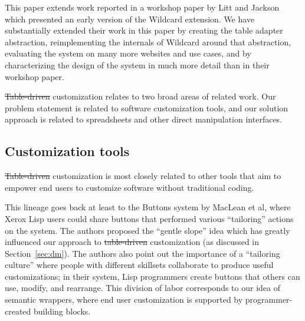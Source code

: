 \documentclass[sigplan,screen,10pt,anonymous,review]{acmart}
\providecommand{\DIFadd}[1]{{\protect\color{blue}\uwave{#1}}} %
\providecommand{\DIFdel}[1]{{\protect\color{red}\sout{#1}}}                      %
\providecommand{\DIFaddbegin}{} %
\providecommand{\DIFaddend}{} %
\providecommand{\DIFdelbegin}{} %
\providecommand{\DIFdelend}{} %
\begin{document}
This paper extends work reported in a workshop paper by Litt and Jackson
\citep{litt2020} which presented an early version of the Wildcard
extension. We have substantially extended their work in this paper by
creating the table adapter abstraction, reimplementing the internals of
Wildcard around that abstraction, evaluating the system on many more
websites and use cases, and by characterizing the design of the system
in much more detail than in their workshop paper.

\DIFdelbegin \DIFdel{Table-driven }\DIFdelend \DIFaddbegin \DIFadd{data-driven }\DIFaddend customization relates to two broad areas of related work.
Our problem statement is related to software customization tools, and
our solution approach is related to spreadsheets and other direct
manipulation interfaces.

\hypertarget{customization-tools}{%
\subsection{Customization tools}\label{customization-tools}}

\DIFdelbegin \DIFdel{Table-driven }\DIFdelend \DIFaddbegin \DIFadd{data-driven }\DIFaddend customization is most closely related to other tools that
aim to empower end users to customize software without traditional
coding.

This lineage goes back at least to the Buttons system by MacLean et
al\DIFaddbegin \DIFadd{.~}\DIFaddend \citep{maclean1990}, where Xerox Lisp users could share buttons that
performed various ``tailoring'' actions on the system. The authors
proposed the ``gentle slope'' idea which has greatly influenced our
approach to \DIFdelbegin \DIFdel{table-driven }\DIFdelend \DIFaddbegin \DIFadd{data-driven }\DIFaddend customization (as discussed in
Section~\ref{sec:dm}). The authors also point out the importance of a
``tailoring culture'' where people with different skillsets collaborate
to produce useful customizations; in their system, Lisp programmers
create buttons that others can use, modify, and rearrange. This division
of labor corresponds to our idea of semantic wrappers, where end user
customization is supported by programmer-created building blocks.
\end{document}
